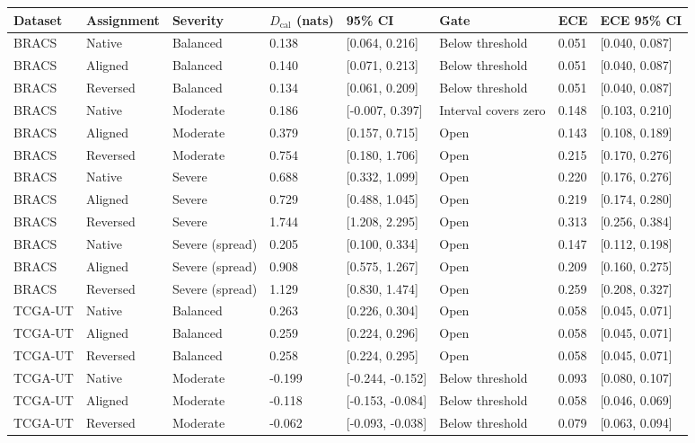 \begin{tabular}{llllllll}
\toprule
Dataset & Assignment & Severity & $D_{\mathrm{cal}}$ (nats) & 95\% CI & Gate & ECE & ECE 95\% CI \\
\midrule
BRACS & Native & Balanced & 0.138 & [0.064, 0.216] & Below threshold & 0.051 & [0.040, 0.087] \\
BRACS & Aligned & Balanced & 0.140 & [0.071, 0.213] & Below threshold & 0.051 & [0.040, 0.087] \\
BRACS & Reversed & Balanced & 0.134 & [0.061, 0.209] & Below threshold & 0.051 & [0.040, 0.087] \\
BRACS & Native & Moderate & 0.186 & [-0.007, 0.397] & Interval covers zero & 0.148 & [0.103, 0.210] \\
BRACS & Aligned & Moderate & 0.379 & [0.157, 0.715] & Open & 0.143 & [0.108, 0.189] \\
BRACS & Reversed & Moderate & 0.754 & [0.180, 1.706] & Open & 0.215 & [0.170, 0.276] \\
BRACS & Native & Severe & 0.688 & [0.332, 1.099] & Open & 0.220 & [0.176, 0.276] \\
BRACS & Aligned & Severe & 0.729 & [0.488, 1.045] & Open & 0.219 & [0.174, 0.280] \\
BRACS & Reversed & Severe & 1.744 & [1.208, 2.295] & Open & 0.313 & [0.256, 0.384] \\
BRACS & Native & Severe (spread) & 0.205 & [0.100, 0.334] & Open & 0.147 & [0.112, 0.198] \\
BRACS & Aligned & Severe (spread) & 0.908 & [0.575, 1.267] & Open & 0.209 & [0.160, 0.275] \\
BRACS & Reversed & Severe (spread) & 1.129 & [0.830, 1.474] & Open & 0.259 & [0.208, 0.327] \\
TCGA-UT & Native & Balanced & 0.263 & [0.226, 0.304] & Open & 0.058 & [0.045, 0.071] \\
TCGA-UT & Aligned & Balanced & 0.259 & [0.224, 0.296] & Open & 0.058 & [0.045, 0.071] \\
TCGA-UT & Reversed & Balanced & 0.258 & [0.224, 0.295] & Open & 0.058 & [0.045, 0.071] \\
TCGA-UT & Native & Moderate & -0.199 & [-0.244, -0.152] & Below threshold & 0.093 & [0.080, 0.107] \\
TCGA-UT & Aligned & Moderate & -0.118 & [-0.153, -0.084] & Below threshold & 0.058 & [0.046, 0.069] \\
TCGA-UT & Reversed & Moderate & -0.062 & [-0.093, -0.038] & Below threshold & 0.079 & [0.063, 0.094] \\

\end{tabular}
